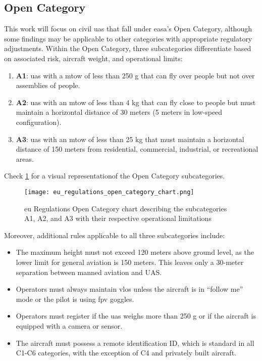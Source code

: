 \subsection{Open Category}
This work will focus on civil \gls{uas} that fall under \gls{easa}'s Open Category, although some findings may be applicable to other categories with appropriate regulatory adjustments. Within the Open Category, three subcategories differentiate based on associated risk, aircraft weight, and operational limits:

\begin{enumerate}
  \item \textbf{A1}: \gls{uas} with a \gls{mtow} of less than 250 g that can fly over people but not over assemblies of people.

  \item \textbf{A2}: \gls{uas} with an \gls{mtow} of less than 4 kg that can fly close to people but must maintain a horizontal distance of 30 meters (5 meters in low-speed configuration).

  \item \textbf{A3}: \gls{uas} with an \gls{mtow} of less than 25 kg that must maintain a horizontal distance of 150 meters from residential, commercial, industrial, or recreational areas.
\end{enumerate}

Check \cref{fig:eu_regulations_open_category_chart} for a visual representationof the Open Category subcategories.

\begin{figure}
  \texttt{[image: eu\_regulations\_open\_category\_chart.png]}
  \caption{\gls{eu} Regulations Open Category chart describing the subcategories A1, A2, and A3 with their respective operational limitations \autocite{ageagleEuropeanUnion}}
  \label{fig:eu_regulations_open_category_chart}
\end{figure}

Moreover, additional rules applicable to all three subcategories include:

\begin{itemize}
  \item The maximum height must not exceed 120 meters above ground level, as the lower limit for general aviation is 150 meters. This leaves only a 30-meter separation between manned aviation and UAS.

  \item Operators must always maintain \gls{vlos} unless the aircraft is in ``follow me'' mode or the pilot is using \gls{fpv} goggles.

  \item Operators must register if the \gls{uas} weighs more than 250 g or if the aircraft is equipped with a camera or sensor.

  \item The aircraft must possess a remote identification ID, which is standard in all C1-C6 categories, with the exception of C4 and privately built aircraft.
\end{itemize}
